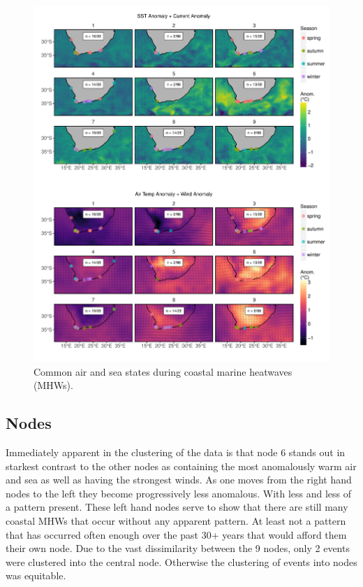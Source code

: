 \documentclass[a4paper,10pt,review]{elsarticle}
\begin{document}
\begin{figure}
\includegraphics[width=1.0\textwidth]{figure_3.pdf}
\caption{Common air and sea states during coastal marine heatwaves (MHWs).}
\label{figure3}
\end{figure}

\subsection{Nodes}
Immediately apparent in the clustering of the data is that node 6 stands out in starkest contrast to the other nodes as containing the most anomalously warm air and sea as well as having the strongest winds. As one moves from the right hand nodes to the left they become progressively less anomalous. With less and less of a pattern present. These left hand nodes serve to show that there are still many coastal MHWs that occur without any apparent pattern. At least not a pattern that has occurred often enough over the past 30+ years that would afford them their own node. Due to the vast dissimilarity between the 9 nodes, only 2 events were clustered into the central node. Otherwise the clustering of events into nodes was equitable.
\end{document}
